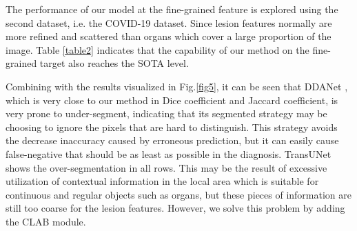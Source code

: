 \documentclass[runningheads]{llncs}
\begin{document}
The performance of our model at the fine-grained feature is explored using the second dataset, i.e. the COVID-19 dataset. Since lesion features normally are more refined and scattered than organs which cover a large proportion of the image. Table \ref{table2} indicates that the capability of our method on the fine-grained target also reaches the SOTA level.
\vspace{-5mm}
\begin{table}[H]\centering
\caption{Performance comparison between our method and other state-of-the-art methods on  Covid-19 dataset (Dice score\% and Hausdorff distance in mm and Jaccard score\%). Avg means result average of all testing cases.}
\vspace{-1mm}
\label{table2}
\end{table}
\vspace{-5mm}
Combining with the results visualized in Fig.\ref{fig5}, it can be seen that  DDANet \cite{tomar2020ddanet}, which is very close to our method in Dice coefficient and Jaccard coefficient, is very prone to under-segment, indicating that its segmented strategy may be choosing to ignore the pixels that are hard to distinguish. This strategy avoids the decrease inaccuracy caused by erroneous prediction, but it can easily cause false-negative that should be as least as possible in the diagnosis. TransUNet \cite{chen2021transunet} shows the over-segmentation in all rows. This may be the result of excessive utilization of contextual information in the local area which is suitable for continuous and regular objects such as organs, but these pieces of information are still too coarse for the lesion features. However, we solve this problem by adding the CLAB module.
\end{document}
